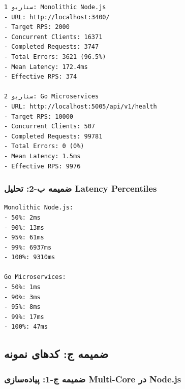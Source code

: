 \documentclass[
]{article}
\begin{document}
\begin{verbatim}
سناریو 1: Monolithic Node.js
- URL: http://localhost:3400/
- Target RPS: 2000
- Concurrent Clients: 16371
- Completed Requests: 3747
- Total Errors: 3621 (96.5%)
- Mean Latency: 172.4ms
- Effective RPS: 374

سناریو 2: Go Microservices
- URL: http://localhost:5005/api/v1/health
- Target RPS: 10000
- Concurrent Clients: 507
- Completed Requests: 99781
- Total Errors: 0 (0%)
- Mean Latency: 1.5ms
- Effective RPS: 9976
\end{verbatim}

\subsubsection{ضمیمه ب-2: تحلیل Latency
Percentiles}\label{ux636ux645ux6ccux645ux647-ux628-2-ux62aux62dux644ux6ccux644-latency-percentiles}

\begin{verbatim}
Monolithic Node.js:
- 50%: 2ms
- 90%: 13ms
- 95%: 61ms
- 99%: 6937ms
- 100%: 9310ms

Go Microservices:
- 50%: 1ms
- 90%: 3ms
- 95%: 8ms
- 99%: 17ms
- 100%: 47ms
\end{verbatim}

\subsection{ضمیمه ج: کدهای
نمونه}\label{ux636ux645ux6ccux645ux647-ux62c-ux6a9ux62fux647ux627ux6cc-ux646ux645ux648ux646ux647}

\subsubsection{ضمیمه ج-1: پیاده‌سازی Multi-Core در
Node.js}\label{ux636ux645ux6ccux645ux647-ux62c-1-ux67eux6ccux627ux62fux647ux633ux627ux632ux6cc-multi-core-ux62fux631-node.js}
\end{document}
